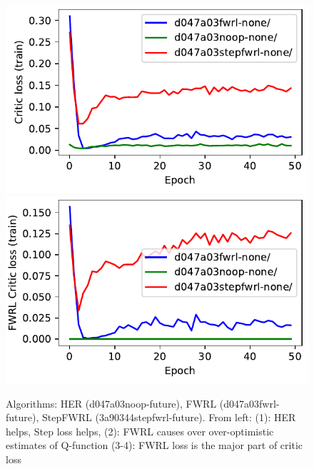 \begin{figure}
  \includegraphics[width=\frac\columnwidth]{media/res/d047a03-FetchReach-v1-stepfwrl-none/train/critic_loss.pdf}%
  \includegraphics[width=\frac\columnwidth]{media/res/d047a03-FetchReach-v1-stepfwrl-none/train/critic_addnl_loss.pdf}
  \caption{
    Algorithms: HER (d047a03noop-future), FWRL (d047a03fwrl-future), StepFWRL
    (3a90344stepfwrl-future). 
    From left: (1): HER helps, Step loss helps,
    (2): FWRL causes over over-optimistic estimates of Q-function
    (3-4): FWRL loss is the major part of critic loss}%
  \label{fig:fwrl-stepfwrl-noop-test-sucess-rate}%
\end{figure}%
% 

